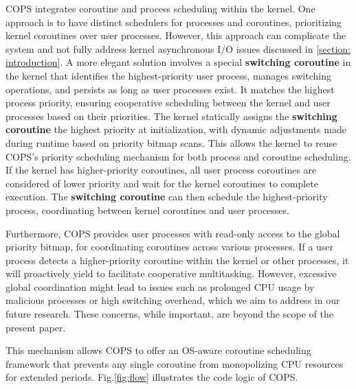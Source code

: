 \documentclass[conference]{IEEEtran}
\begin{document}
COPS integrates coroutine and process scheduling within the kernel. One approach is to have distinct schedulers for processes and coroutines, prioritizing kernel coroutines over user processes. However, this approach can complicate the system and not fully address kernel asynchronous I/O issues discussed in \ref{section: introduction}. A more elegant solution involves a special \textbf{switching coroutine} in the kernel that identifies the highest-priority user process, manages switching operations, and persists as long as user processes exist. It matches the highest process priority, ensuring cooperative scheduling between the kernel and user processes based on their priorities. The kernel statically assigns the \textbf{switching coroutine} the highest priority at initialization, with dynamic adjustments made during runtime based on priority bitmap scans. This allows the kernel to reuse COPS's priority scheduling mechanism for both process and coroutine scheduling. If the kernel has higher-priority coroutines, all user process coroutines are considered of lower priority and wait for the kernel coroutines to complete execution. The \textbf{switching coroutine} can then schedule the highest-priority process, coordinating between kernel coroutines and user processes.

Furthermore, COPS provides user processes with read-only access to the global priority bitmap, for coordinating coroutines across various processes. If a user process detects a higher-priority coroutine within the kernel or other processes, it will proactively yield to facilitate cooperative multitasking. However, excessive global coordination might lead to issues such as prolonged CPU usage by malicious processes or high switching overhead, which we aim to address in our future research. These concerns, while important, are beyond the scope of the present paper.

This mechanism allows COPS to offer an OS-aware coroutine scheduling framework that prevents any single coroutine from monopolizing CPU resources for extended periods. Fig.\ref{fig:flow} illustrates the code logic of COPS.
\end{document}
